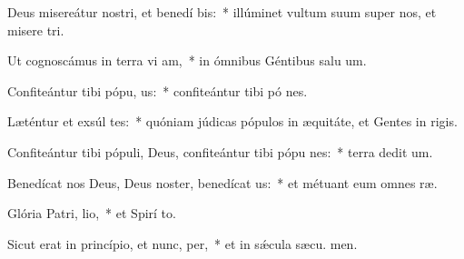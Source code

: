 \item Deus misereátur nostri, et benedí bis:~* illúminet vultum suum super nos, et misere tri.
\item Ut cognoscámus in terra vi am,~* in ómnibus Géntibus salu um.
\item Confiteántur tibi pópu, us:~* confiteántur tibi pó nes.
\item Læténtur et exsúl tes:~* quóniam júdicas pópulos in æquitáte, et Gentes in  rigis.
\item Confiteántur tibi pópuli, Deus, confiteántur tibi pópu nes:~* terra dedit  um.
\item Benedícat nos Deus, Deus noster, benedícat  us:~* et métuant eum omnes  ræ.
\item Glória Patri,  lio,~* et Spirí to.
\item Sicut erat in princípio, et nunc,  per,~* et in sǽcula sæcu. men.
